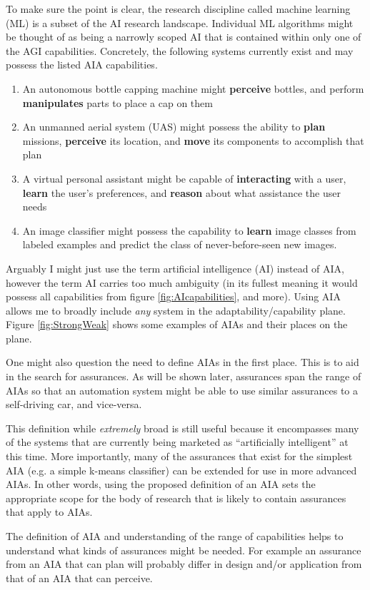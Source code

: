     To make sure the point is clear, the research discipline called machine learning (ML) is a subset of the AI research landscape. Individual ML algorithms might be thought of as being a narrowly scoped AI that is contained within only one of the AGI capabilities. Concretely, the following systems currently exist and may possess the listed AIA capabilities.

    \begin{enumerate}
         \item An autonomous bottle capping machine might \textbf{perceive} bottles, and perform \textbf{manipulates} parts to place a cap on them
         \item An unmanned aerial system (UAS) might possess the ability to \textbf{plan} missions, \textbf{perceive} its location, and \textbf{move} its components to accomplish that plan
         \item A virtual personal assistant might be capable of \textbf{interacting} with a user, \textbf{learn} the user's preferences, and \textbf{reason} about what assistance the user needs
         \item An image classifier might possess the capability to \textbf{learn} image classes from labeled examples and predict the class of never-before-seen new images.
     \end{enumerate}

    Arguably I might just use the term artificial intelligence (AI) instead of AIA, however the term AI carries too much ambiguity (in its fullest meaning it would possess all capabilities from figure \ref{fig:AIcapabilities}, and more). Using AIA allows me to broadly include \emph{any} system in the adaptability/capability plane. Figure \ref{fig:StrongWeak} shows some examples of AIAs and their places on the plane.

    One might also question the need to define AIAs in the first place. This is to aid in the search for assurances. As will be shown later, assurances span the range of AIAs so that an automation system might be able to use similar assurances to a self-driving car, and vice-versa.

    This definition while \emph{extremely} broad is still useful because it encompasses many of the systems that are currently being marketed as ``artificially intelligent'' at this time. More importantly, many of the assurances that exist for the simplest AIA (e.g. a simple k-means classifier) can be extended for use in more advanced AIAs. In other words, using the proposed definition of an AIA sets the appropriate scope for the body of research that is likely to contain assurances that apply to AIAs.

    The definition of AIA and understanding of the range of capabilities helps to understand what kinds of assurances might be needed. For example an assurance from an AIA that can plan will probably differ in design and/or application from that of an AIA that can perceive.
